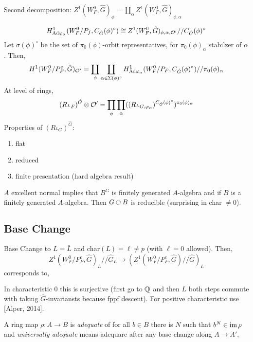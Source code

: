 \documentclass[12pt]{article}
\begin{document}
Second decomposition: $Z^1(W_F^0, \hat{G})_\phi = \coprod_{\alpha} Z^1(W_F^0, \hat{G})_{\phi, \alpha}$ 

\[ H^1_{\mathrm{Ad} \varphi_{\alpha}}(W_F^0/P_f, C_{\hat{G}}(\phi)^\circ) \cong Z^1(W_F^0, \hat{G})_{\phi, \alpha, \mathcal{O}'} // C_{\hat{G}}(\phi)^\circ \]
Let $\sigma(\phi)^\circ$ be the set of $\pi_0(\phi)$-orbit representatives, for $\pi_0(\phi)_\alpha$ stabilzer of $\alpha$. Then,
\[ H^1(W_F^0/ P_F^e, \hat{G})_{\mathcal{O}'} = \coprod_{\phi} \coprod_{\alpha \in \Sigma(\phi)^\circ} H^1_{\mathrm{Ad} \varphi_\alpha}(W_F^0/P_F, C_{\hat{G}}(\phi)^\circ) // \pi_0(\phi)_{\alpha} \]
At level of rings,
\[ (R_{{}^L F})^{\hat{G}} \otimes \mathcal{O}' = \prod_{\phi} \prod_\alpha ((R_{{}^L G, \varphi_\alpha})^{C_{\hat{G}}(\phi)^\circ})^{\pi_0(\phi)_{\alpha}} \]
Properties of $(R_{{}^L G})^{\hat{G}}$:
\begin{enumerate}
\item flat
\item reduced
\item finite presentation (hard algebra result)
\end{enumerate}

\begin{rmk}
$A$ excellent normal implies that $B^G$ is finitely generated $A$-algebra and if $B$ is a finitely generated $A$-algebra. Then $G \acts B$ is reducible (surprising in char $\neq 0$). 
\end{rmk}

\subsection{Base Change}

Base Change to $L = \bar{L}$ and $\mathrm{char}(L) = \ell \neq p$ (with $\ell = 0$ allowed). Then,
\[ Z^1(W_F^0/P_F^e, \hat{G})_L // \hat{G}_L \to (Z^1(W_F^0/P_F^e, \hat{G}) // \hat{G})_L \]
corresponds to,
\begin{center}
\end{center}
In characteristic 0 this is surjective (first go to $\mathbb{Q}$ and then $L$ both steps commute with taking $\hat{G}$-invariansts because fppf descent). For positive characteristic use [Alper, 2014]. 

\begin{defn}
A ring map $\rho : A \to B$ is \textit{adequate} of for all $b \in B$ there is $N$ such that $b^N \in \operatorname{\mathrm{im}}{\rho}$ and \textit{universally adequate} means adequare after any base change along $A \to A'$, 
\end{defn}
\end{document}
